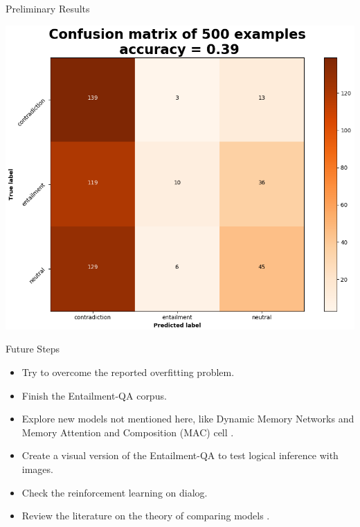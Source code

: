 \documentclass[10pt]{beamer}
\begin{document}
\begin{frame}{Preliminary Results}
\begin{center}
\includegraphics[scale=0.42]{images/cm_mem_EntailQA2.png}
\end{center}
\end{frame}


\begin{frame}{Future Steps}
\begin{itemize}
\item Try to overcome the reported overfitting problem. 
\item Finish the Entailment-QA corpus.
\item Explore new models not mentioned here, like \alert{Dynamic Memory Networks} \cite{KumarISBEPOGS15} and  \alert{Memory Attention and Composition (MAC) cell} \cite{Manning18}.
\item Create a visual version of the Entailment-QA to test logical inference with images.
\item Check the reinforcement learning on dialog.
\item Review the literature on the theory of comparing models \cite{BenavoliCDZ17}.
\end{itemize}
\end{frame}
\end{document}
